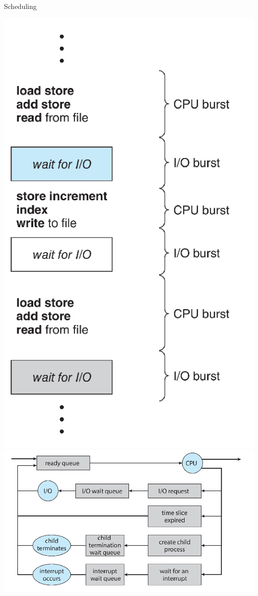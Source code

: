 \documentclass[10pt]{beamer}
\begin{document}
\begin{frame}[allowframebreaks]{Scheduling}
\begin{center}
    \includegraphics[keepaspectratio, width=\textwidth, height=\textheight-2\baselineskip-2\baselineskip]{img/011_bursts.png} \\ \framebreak
    \includegraphics[keepaspectratio, width=\textwidth, height=\textheight-2\baselineskip-2\baselineskip]{img/011_sched.png} \\ \framebreak

\end{center}
\end{frame}
\end{document}
